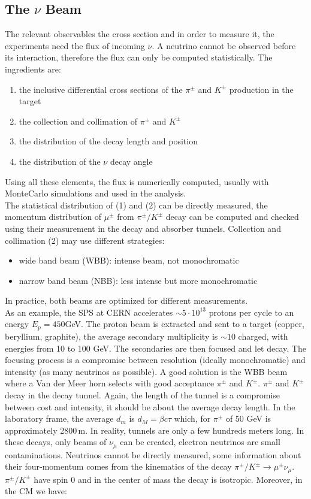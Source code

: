 \documentclass[10.75pt,a4paper,openright,bottom=2cm]{article}
\begin{document}
\subsection{The $\nu$ Beam}
The relevant observables the cross section and in order to measure it, the experiments need the flux of incoming $\nu$. A neutrino cannot be observed before its interaction, therefore the flux can only be computed statistically. The ingredients are:
\begin{enumerate}
    \item the inclusive differential cross sections of the $\pi^\pm$ and $K^\pm$ production in the target
    \item the collection and collimation of $\pi^\pm$ and $K^\pm$
    \item the distribution of the decay length and position
    \item the distribution of the $\nu$ decay angle
\end{enumerate}
Using all these elements, the flux is numerically computed, usually with MonteCarlo simulations and used in the analysis.\\
The statistical distribution of (1) and (2) can be directly measured, the momentum distribution of $\mu^\pm$ from $\pi^\pm/K^\pm$ decay can be computed and checked using their measurement in the decay and absorber tunnels. Collection and collimation (2) may use different strategies:
\begin{itemize}
    \item wide band beam (WBB): intense beam, not monochromatic
    \item narrow band beam (NBB): less intense but more monochromatic
\end{itemize}
In practice, both beams are optimized for different measurements.\\
As an example, the SPS at CERN accelerates $\sim5\cdot10^{13}$ protons per cycle to an energy $E_p=450$\;GeV. The proton beam is extracted and sent to a target (copper, beryllium, graphite), the average secondary multiplicity is $\sim10$ charged, with energies from 10 to 100 GeV. The secondaries are then focused and let decay. The focusing process is a compromise between resolution (ideally monochromatic) and intensity (as many neutrinos as possible). A good solution is the WBB beam where a Van der Meer horn selects with good acceptance $\pi^\pm$ and $K^\pm$. $\pi^\pm$ and $K^\pm$ decay in the decay tunnel. Again, the length of the tunnel is a compromise between cost and intensity, it should be about the average decay length. In the laboratory frame, the average $d_m$ is $d_M=\beta c\tau$ which, for $\pi^\pm$ of 50 GeV is approximately 2800\,m. In reality, tunnels are only a few hundreds meters long. In these decays, only beams of $\nu_\mu$ can be created, electron neutrinos are small contaminations. Neutrinos cannot be directly measured, some information about their four-momentum comes from the kinematics of the decay $\pi^\pm/K^\pm\to\mu^\pm\nu_\mu$. $\pi^\pm/K^\pm$ have spin 0 and in the center of mass the decay is isotropic. Moreover, in the CM we have:
\end{document}
